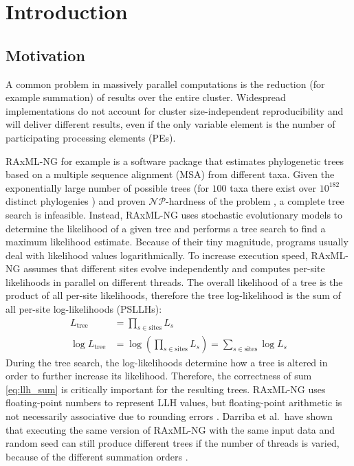 \chapter{Introduction}
\label{ch:Introduction}

\section{Motivation}
\label{sec:Motivation}
A common problem in massively parallel computations is the reduction (for example summation) of results over the entire cluster.
Widespread implementations do not account for cluster size-independent reproducibility and will deliver different results,
even if the only variable element is the number of participating processing elements (PEs).

RAxML-NG \cite{kozlov_raxml-ng_2019-1} for example is a software package that estimates phylogenetic trees based on a
multiple sequence alignment (MSA) from different taxa. Given the exponentially large number of possible trees
(for $100$ taxa there exist over $10^{182}$ distinct phylogenies \cite{stamatakis_efficient_2020}) and 
proven $\mathcal{NP}$-hardness of the problem \cite{roch_short_2006}, a complete tree search is infeasible.
Instead, RAxML-NG uses stochastic evolutionary models to determine the likelihood of a given tree and performs
a tree search to find a maximum likelihood estimate. Because of their tiny magnitude, programs usually deal with likelihood values
logarithmically.
To increase execution speed, RAxML-NG assumes that different sites evolve independently and computes per-site likelihoods
in parallel on different threads. The overall likelihood of a tree is the product of all per-site likelihoods, therefore
the tree log-likelihood is the sum of all per-site log-likelihoods (PSLLHs):
\begin{align}
L_{\textrm{tree}} &= \prod_{s \in \textrm{sites}} L_s \\
\label{eq:llh_sum}
\log L_{\textrm{tree}} &= \log (\prod_{s \in \textrm{sites}} L_s) = \sum_{s \in \textrm{sites}}  \log L_s
\end{align}
During the tree search, the log-likelihoods determine how a tree is altered in order to further increase its likelihood.
Therefore, the correctness of sum \eqref{eq:llh_sum} is critically important for the resulting trees.
RAxML-NG uses floating-point numbers to represent LLH values, but floating-point arithmetic is not necessarily associative
due to rounding errors \cite{goldberg_what_1991}. Darriba et al.\ have shown that executing the same version of
RAxML-NG with the same input data and random seed can still produce different trees if the number of threads is varied,
because of the different summation orders \cite{darriba_state_2018}.